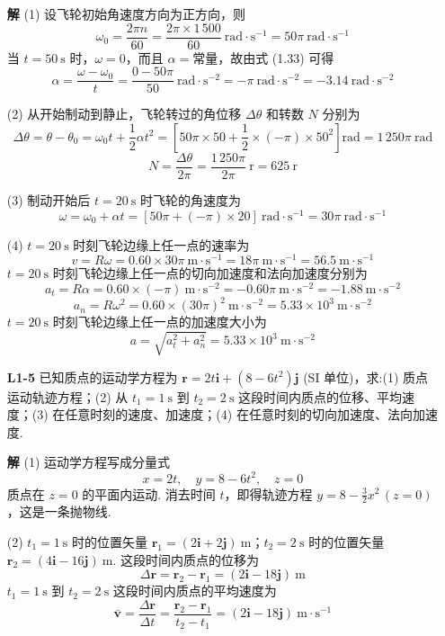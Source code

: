 \begin{enumerate}
	\textbf{解} \quad (1) 设飞轮初始角速度方向为正方向，则
	\[
	\omega_0 = \frac{2\pi n}{60} = \frac{2\pi \times 1\,500}{60} \mathrm{\ rad \cdot s^{-1}} = 50\pi \mathrm{\ rad \cdot s^{-1}}
	\]
	当 $t = 50 \mathrm{\ s}$ 时，$\omega = 0$，而且 $\alpha = \text{常量}$，故由式 (1.33) 可得
	\[
	\alpha = \frac{\omega - \omega_0}{t} = \frac{0 - 50\pi}{50} \mathrm{\ rad \cdot s^{-2}} = -\pi \mathrm{\ rad \cdot s^{-2}} = -3.14 \mathrm{\ rad \cdot s^{-2}}
	\]
	
	(2) 从开始制动到静止，飞轮转过的角位移 $\Delta\theta$ 和转数 $N$ 分别为
	\[
	\Delta\theta = \theta - \theta_0 = \omega_0 t + \frac{1}{2}\alpha t^2 = \left[ 50\pi \times 50 + \frac{1}{2} \times (-\pi) \times 50^2 \right] \mathrm{rad} = 1\,250\pi \mathrm{\ rad}
	\]
	\[
	N = \frac{\Delta\theta}{2\pi} = \frac{1\,250\pi}{2\pi} \mathrm{\ r} = 625 \mathrm{\ r}
	\]
	
	(3) 制动开始后 $t = 20 \mathrm{\ s}$ 时飞轮的角速度为
	\[
	\omega = \omega_0 + \alpha t = \left[ 50\pi + (-\pi) \times 20 \right] \mathrm{\ rad \cdot s^{-1}} = 30\pi \mathrm{\ rad \cdot s^{-1}}
	\]
	
	(4) $t = 20 \mathrm{\ s}$ 时刻飞轮边缘上任一点的速率为
	\[
	v = R\omega = 0.60 \times 30\pi \mathrm{\ m \cdot s^{-1}} = 18\pi \mathrm{\ m \cdot s^{-1}} = 56.5 \mathrm{\ m \cdot s^{-1}}
	\]
	$t = 20 \mathrm{\ s}$ 时刻飞轮边缘上任一点的切向加速度和法向加速度分别为
	\[
	a_t = R\alpha = 0.60 \times (-\pi) \mathrm{\ m \cdot s^{-2}} = -0.60\pi \mathrm{\ m \cdot s^{-2}} = -1.88 \mathrm{\ m \cdot s^{-2}}
	\]
	\[
	a_n = R\omega^2 = 0.60 \times (30\pi)^2 \mathrm{\ m \cdot s^{-2}} = 5.33 \times 10^3 \mathrm{\ m \cdot s^{-2}}
	\]
	$t = 20 \mathrm{\ s}$ 时刻飞轮边缘上任一点的加速度大小为
	\[
	a = \sqrt{a_t^2 + a_n^2} = 5.33 \times 10^3 \mathrm{\ m \cdot s^{-2}}
	\]
	
	\vspace{2em}
	
	\item [\textbf{L1-5}]
	\quad 已知质点的运动学方程为 $\boldsymbol{r} = 2t\boldsymbol{i} + (8 - 6t^2)\boldsymbol{j}$ (SI 单位)，求:(1) 质点运动轨迹方程；(2) 从 $t_1 = 1\mathrm{\ s}$ 到 $t_2 = 2\mathrm{\ s}$ 这段时间内质点的位移、平均速度；(3) 在任意时刻的速度、加速度；(4) 在任意时刻的切向加速度、法向加速度.
	
	\textbf{解} \quad (1) 运动学方程写成分量式
	\[
	x = 2t, \quad y = 8 - 6t^2, \quad z = 0
	\]
	质点在 $z = 0$ 的平面内运动. 消去时间 $t$，即得轨迹方程 $y = 8 - \frac{3}{2}x^2 \, (z=0)$，这是一条抛物线.
	
	(2) $t_1 = 1\mathrm{\ s}$ 时的位置矢量 $\boldsymbol{r}_1 = (2\boldsymbol{i} + 2\boldsymbol{j})\mathrm{\ m}$；$t_2 = 2\mathrm{\ s}$ 时的位置矢量 $\boldsymbol{r}_2 = (4\boldsymbol{i} - 16\boldsymbol{j})\mathrm{\ m}$. 这段时间内质点的位移为
	\[
	\Delta\boldsymbol{r} = \boldsymbol{r}_2 - \boldsymbol{r}_1 = (2\boldsymbol{i} - 18\boldsymbol{j})\mathrm{\ m}
	\]
	$t_1 = 1\mathrm{\ s}$ 到 $t_2 = 2\mathrm{\ s}$ 这段时间内质点的平均速度为
	\[
	\bar{\boldsymbol{v}} = \frac{\Delta\boldsymbol{r}}{\Delta t} = \frac{\boldsymbol{r}_2 - \boldsymbol{r}_1}{t_2 - t_1} = (2\boldsymbol{i} - 18\boldsymbol{j})\mathrm{\ m \cdot s^{-1}}
	\]
	

\end{enumerate}
